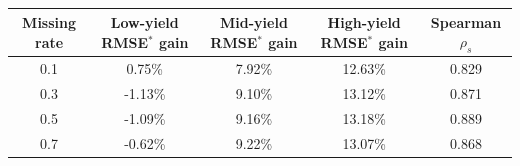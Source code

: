\begin{tabular}{@{}c c c c c@{}}
\toprule
Missing rate & Low-yield RMSE$^\ast$ gain & Mid-yield RMSE$^\ast$ gain & High-yield RMSE$^\ast$ gain & Spearman $\rho_s$\\
\midrule
0.1 & 0.75\% & 7.92\% & 12.63\% & 0.829\\
0.3 & -1.13\% & 9.10\% & 13.12\% & 0.871\\
0.5 & -1.09\% & 9.16\% & 13.18\% & 0.889\\
0.7 & -0.62\% & 9.22\% & 13.07\% & 0.868\\
\bottomrule
\end{tabular}
